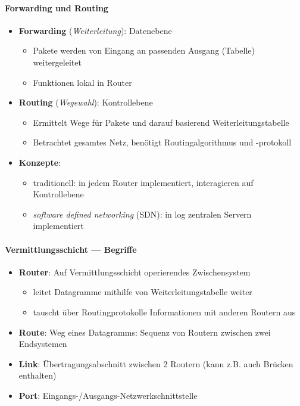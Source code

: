 \paragraph{Forwarding und Routing}
\begin{itemize}
  \item \textbf{Forwarding} (\emph{Weiterleitung}): Datenebene
  \begin{itemize}
    \item Pakete werden von Eingang an passenden Ausgang (Tabelle) weitergeleitet
    \item Funktionen lokal in Router
  \end{itemize}
  \item \textbf{Routing} (\emph{Wegewahl}): Kontrollebene
  \begin{itemize}
    \item Ermittelt Wege für Pakete und darauf basierend Weiterleitungstabelle
    \item Betrachtet gesamtes Netz, benötigt Routingalgorithmus und -protokoll
  \end{itemize}
  \item \textbf{Konzepte}:
  \begin{itemize}
    \item traditionell: in jedem Router implementiert, interagieren auf Kontrollebene
    \item \emph{software defined networking} (SDN): in log zentralen Servern implementiert
  \end{itemize}
\end{itemize}

\paragraph{Vermittlungsschicht --- Begriffe}
\begin{itemize}
  \item \textbf{Router}: Auf Vermittlungsschicht operierendes Zwischensystem
  \begin{itemize}
    \item leitet Datagramme mithilfe von Weiterleitungstabelle weiter
    \item tauscht über Routingprotokolle Informationen mit anderen Routern aus
  \end{itemize}
  \item \textbf{Route}: Weg eines Datagramms: Sequenz von Routern zwischen zwei Endsystemen
  \item \textbf{Link}: Übertragungsabschnitt zwischen 2 Routern (kann z.B. auch Brücken enthalten)
  \item \textbf{Port}: Eingangs-/Ausgangs-Netzwerkschnittstelle
\end{itemize}

